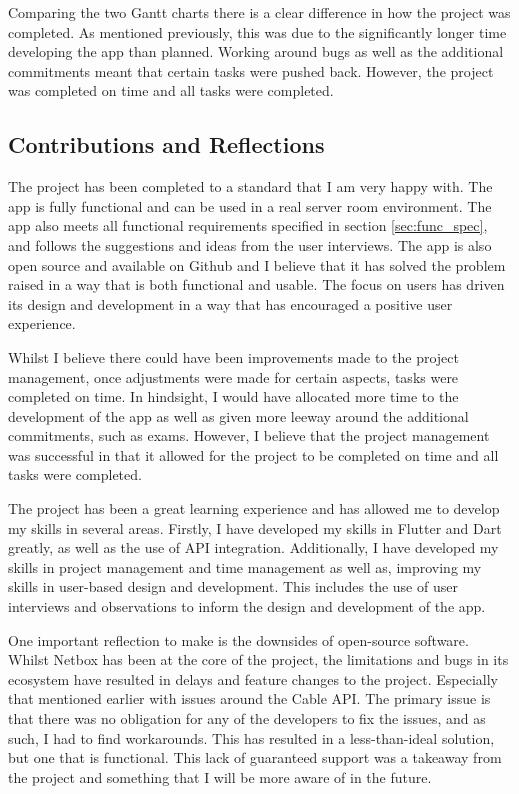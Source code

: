 \documentclass [11pt,a4paper]{article}
\begin{document}
Comparing the two Gantt charts there is a clear difference in how the project was completed. As mentioned previously, this was due to the significantly longer time developing the app than planned. Working around bugs as well as the additional commitments meant that certain tasks were pushed back. However, the project was completed on time and all tasks were completed.


\subsection{Contributions and Reflections}
\label{sec:reflections}

The project has been completed to a standard that I am very happy with. The app is fully functional and can be used in a real server room environment. The app also meets all functional requirements specified in section \ref{sec:func_spec}, and follows the suggestions and ideas from the user interviews. The app is also open source and available on Github \cite{keeptrackgithub} and I believe that it has solved the problem raised in a way that is both functional and usable. The focus on users has driven its design and development in a way that has encouraged a positive user experience.

Whilst I believe there could have been improvements made to the project management, once adjustments were made for certain aspects, tasks were completed on time. In hindsight, I would have allocated more time to the development of the app as well as given more leeway around the additional commitments, such as exams. However, I believe that the project management was successful in that it allowed for the project to be completed on time and all tasks were completed. 

The project has been a great learning experience and has allowed me to develop my skills in several areas. Firstly, I have developed my skills in Flutter and Dart greatly, as well as the use of API integration. Additionally, I have developed my skills in project management and time management as well as, improving my skills in user-based design and development. This includes the use of user interviews and observations to inform the design and development of the app. 

One important reflection to make is the downsides of open-source software. Whilst Netbox has been at the core of the project, the limitations and bugs in its ecosystem have resulted in delays and feature changes to the project. Especially that mentioned earlier with issues around the Cable API. The primary issue is that there was no obligation for any of the developers to fix the issues, and as such, I had to find workarounds. This has resulted in a less-than-ideal solution, but one that is functional. This lack of guaranteed support was a takeaway from the project and something that I will be more aware of in the future.
\end{document}
